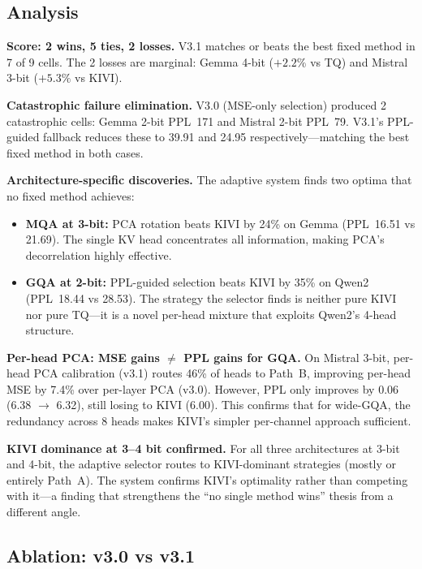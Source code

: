 \documentclass{article}
\begin{document}
\subsection{Analysis}

\textbf{Score: 2 wins, 5 ties, 2 losses.} V3.1 matches or beats the
best fixed method in 7 of 9 cells. The 2 losses are marginal: Gemma
4-bit ($+2.2\%$ vs TQ) and Mistral 3-bit ($+5.3\%$ vs KIVI).

\textbf{Catastrophic failure elimination.} V3.0 (MSE-only selection)
produced 2 catastrophic cells: Gemma 2-bit PPL~171 and Mistral 2-bit
PPL~79. V3.1's PPL-guided fallback reduces these to 39.91 and 24.95
respectively---matching the best fixed method in both cases.

\textbf{Architecture-specific discoveries.} The adaptive system finds
two optima that no fixed method achieves:
\begin{itemize}[nosep]
\item \textbf{MQA at 3-bit:} PCA rotation beats KIVI by 24\% on Gemma
      (PPL~16.51 vs 21.69). The single KV head concentrates all
      information, making PCA's decorrelation highly effective.
\item \textbf{GQA at 2-bit:} PPL-guided selection beats KIVI by 35\%
      on Qwen2 (PPL~18.44 vs 28.53). The strategy the selector finds
      is neither pure KIVI nor pure TQ---it is a novel per-head mixture
      that exploits Qwen2's 4-head structure.
\end{itemize}

\textbf{Per-head PCA: MSE gains $\neq$ PPL gains for GQA.} On Mistral
3-bit, per-head PCA calibration (v3.1) routes 46\% of heads to Path~B,
improving per-head MSE by 7.4\% over per-layer PCA (v3.0). However,
PPL only improves by 0.06 (6.38 $\to$ 6.32), still losing to KIVI
(6.00). This confirms that for wide-GQA, the redundancy across 8 heads
makes KIVI's simpler per-channel approach sufficient.

\textbf{KIVI dominance at 3--4 bit confirmed.} For all three
architectures at 3-bit and 4-bit, the adaptive selector routes to
KIVI-dominant strategies (mostly or entirely Path~A). The system
confirms KIVI's optimality rather than competing with it---a finding
that strengthens the ``no single method wins'' thesis from a different
angle.

\subsection{Ablation: v3.0 vs v3.1}
\end{document}
